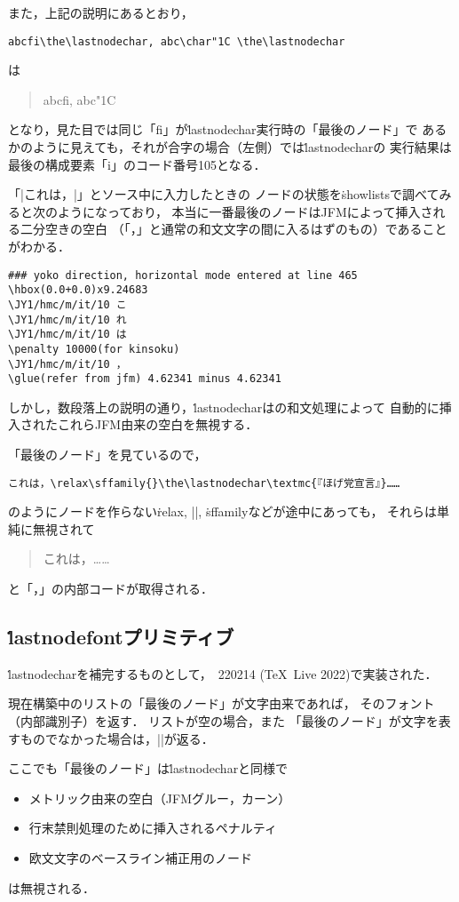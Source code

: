 \documentclass[a4paper,11pt,nomag,dvipdfmx]{jsarticle}
\begin{document}
また，上記の説明にあるとおり，
\begin{verbatim}
abcfi\the\lastnodechar, abc\char"1C \the\lastnodechar
\end{verbatim}
は
\begin{quote}
abcfi\the\lastnodechar, abc\char"1C \the\lastnodechar
\end{quote}
となり，見た目では同じ「fi」が\.{lastnodechar}実行時の「最後のノード」で
あるかのように見えても，それが合字の場合（左側）では\.{lastnodechar}の
実行結果は最後の構成要素「i」のコード番号105となる．

\begin{dangerous}
  「|これは，|」とソース中に入力したときの
  ノードの状態を\.{showlists}で調べてみると次のようになっており，
  本当に一番最後のノードはJFMによって挿入される二分空きの空白
  （「，」と通常の和文文字の間に入るはずのもの）であることがわかる．
\begin{verbatim}
### yoko direction, horizontal mode entered at line 465
\hbox(0.0+0.0)x9.24683
\JY1/hmc/m/it/10 こ
\JY1/hmc/m/it/10 れ
\JY1/hmc/m/it/10 は
\penalty 10000(for kinsoku)
\JY1/hmc/m/it/10 ，
\glue(refer from jfm) 4.62341 minus 4.62341
\end{verbatim}
  しかし，数段落上の説明の通り，\.{lastnodechar}は\pTeX の和文処理によって
  自動的に挿入されたこれらJFM由来の空白を無視する．
\end{dangerous}

「最後のノード」を見ているので，
\begin{verbatim}
これは，\relax\sffamily{}\the\lastnodechar\textmc{『ほげ党宣言』}……
\end{verbatim}
のようにノードを作らない\.{relax}, |{}|, \.{sffamily}などが途中にあっても，
それらは単純に無視されて
\begin{quote}
これは，\relax\sffamily{}\the\lastnodechar{}……
\end{quote}
と「，」の内部コードが取得される．


\subsection{\.{lastnodefont}プリミティブ}
\.{lastnodechar}を補完するものとして，\epTeX~220214 (\TeX~Live 2022)で実装された．
\begin{cslist}
  現在構築中のリストの「最後のノード」が文字由来であれば，
  そのフォント（内部識別子）を返す．
  リストが空の場合，また
  「最後のノード」が文字を表すものでなかった場合は，|\nullfont|が返る．

  ここでも「最後のノード」は\.{lastnodechar}と同様で
  \begin{itemize}
    \item メトリック由来の空白（JFMグルー，カーン）
    \item 行末禁則処理のために挿入されるペナルティ
    \item 欧文文字のベースライン補正用のノード
  \end{itemize}
  は無視される．
\end{cslist}
\end{document}
